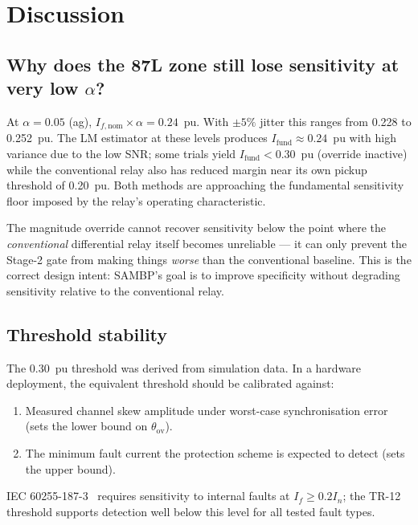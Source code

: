 \documentclass[11pt,a4paper]{article}
\newcommand{\Ifund}{I_{\mathrm{fund}}}
\begin{document}
\section{Discussion}
\label{sec:discussion}

\subsection{Why does the 87L zone still lose sensitivity at very low $\alpha$?}

At $\alpha = 0.05$ (ag), $I_{f,\mathrm{nom}} \times \alpha = 0.24$~pu.  With
$\pm5\%$ jitter this ranges from 0.228 to 0.252~pu.  The LM estimator at
these levels produces $\Ifund \approx 0.24$~pu with high variance due to the
low SNR; some trials yield $\Ifund < 0.30$~pu (override inactive) while the
conventional relay also has reduced margin near its own pickup threshold of
0.20~pu.  Both methods are approaching the fundamental sensitivity floor
imposed by the relay's operating characteristic.

The magnitude override cannot recover sensitivity below the point where the
\emph{conventional} differential relay itself becomes unreliable — it can
only prevent the Stage-2 gate from making things \emph{worse} than the
conventional baseline.  This is the correct design intent: SAMBP's goal
is to improve specificity without degrading sensitivity relative to the
conventional relay.

\subsection{Threshold stability}

The 0.30~pu threshold was derived from simulation data.  In a hardware
deployment, the equivalent threshold should be calibrated against:
\begin{enumerate}
  \item Measured channel skew amplitude under worst-case synchronisation
        error (sets the lower bound on $\theta_{\mathrm{ov}}$).
  \item The minimum fault current the protection scheme is expected to detect
        (sets the upper bound).
\end{enumerate}
IEC 60255-187-3~\cite{IEC60255} requires sensitivity to internal faults at
$I_f \geq 0.2 I_n$; the TR-12 threshold supports detection well below this
level for all tested fault types.
\end{document}
